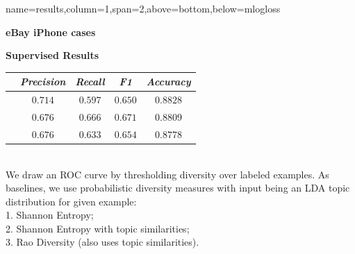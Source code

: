 \documentclass[portrait,a0paper]{baposter-templ/baposter}
\begin{document}
\begin{poster}
{name=results,column=1,span=2,above=bottom,below=mlogloss}{ 
\vspace{-1mm}
\begin{multicols}{2}
\begin{center}
{\bf eBay iPhone cases} \quad\quad{}

\vspace{1mm}
{\bf Supervised Results}
\begin{tabular}{l|c|c|c|c}
\rowcolor{yellow} \cellcolor{lightyellow}
&{\it Precision} & {\it Recall} & {\it F1} & {\it Accuracy}\\ 
\hline 
\rowcolor{white} \cellcolor{yellow}{\bf JSD}         &$\mathbf{0.714}$&$0.597$&$0.650$& $\mathbf{0.8828}$\\
\rowcolor{white} \cellcolor{yellow}{\bf RAE}             &$0.676$&$\mathbf{0.666}$&$\mathbf{0.671}$&$0.8809$ \\
\rowcolor{white} \cellcolor{yellow}{\bf LSI}             &$0.676$&$0.633$&$0.654$&$0.8778$\\
\end{tabular}
\end{center}

\ \\
We draw an ROC curve by thresholding diversity
  over labeled examples. As baselines, we use probabilistic diversity 
  measures with input being an LDA topic distribution for  given
  example:\\
1. Shannon Entropy;\\
2. Shannon Entropy with topic similarities;\\
3. Rao Diversity (also uses topic similarities).


\end{multicols}}
\end{poster}
\end{document}
